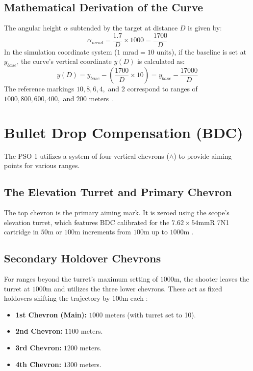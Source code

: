 \documentclass[11pt,a4paper]{article}
\begin{document}
\subsection{Mathematical Derivation of the Curve}
The angular height $\alpha$ subtended by the target at distance $D$ is given by:
\begin{equation}
    \alpha_{mrad} = \frac{1.7}{D} \times 1000 = \frac{1700}{D}
\end{equation}
In the simulation coordinate system ($1 \text{ mrad} = 10 \text{ units}$), if the baseline is set at $y_{base}$, the curve's vertical coordinate $y(D)$ is calculated as:
\begin{equation}
    y(D) = y_{base} - \left( \frac{1700}{D} \times 10 \right) = y_{base} - \frac{17000}{D}
\end{equation}
The reference markings $10, 8, 6, 4,$ and $2$ correspond to ranges of $1000, 800, 600, 400,$ and $200$ meters \cite{wiki:pso1}.

\section{Bullet Drop Compensation (BDC)}
The PSO-1 utilizes a system of four vertical chevrons ($\land$) to provide aiming points for various ranges.

\subsection{The Elevation Turret and Primary Chevron}
The top chevron is the primary aiming mark. It is zeroed using the scope's elevation turret, which features BDC calibrated for the $7.62\times54$mmR 7N1 cartridge in $50$m or $100$m increments from $100$m up to $1000$m \cite{wiki:pso1}. 

\subsection{Secondary Holdover Chevrons}
For ranges beyond the turret's maximum setting of $1000$m, the shooter leaves the turret at $1000$m and utilizes the three lower chevrons. These act as fixed holdovers shifting the trajectory by $100$m each \cite{wiki:pso1}:
\begin{itemize}
    \item \textbf{1st Chevron (Main):} $1000$ meters (with turret set to 10).
    \item \textbf{2nd Chevron:} $1100$ meters.
    \item \textbf{3rd Chevron:} $1200$ meters.
    \item \textbf{4th Chevron:} $1300$ meters.
\end{itemize}
\end{document}
